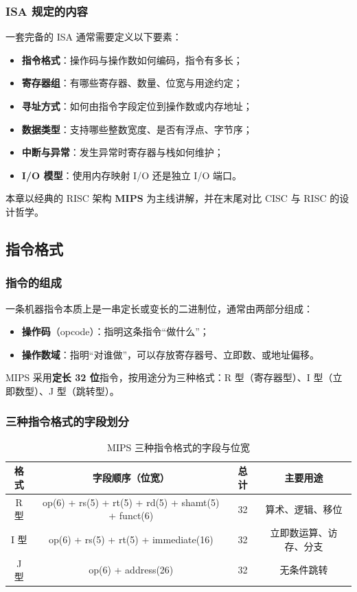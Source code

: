 \subsubsection{ISA 规定的内容}

一套完备的 ISA 通常需要定义以下要素：

\begin{itemize}
    \item \textbf{指令格式}：操作码与操作数如何编码，指令有多长；
    \item \textbf{寄存器组}：有哪些寄存器、数量、位宽与用途约定；
    \item \textbf{寻址方式}：如何由指令字段定位到操作数或内存地址；
    \item \textbf{数据类型}：支持哪些整数宽度、是否有浮点、字节序；
    \item \textbf{中断与异常}：发生异常时寄存器与栈如何维护；
    \item \textbf{I/O 模型}：使用内存映射 I/O 还是独立 I/O 端口。
\end{itemize}

本章以经典的 RISC 架构 \textbf{MIPS} 为主线讲解，并在末尾对比 CISC 与 RISC 的设计哲学。

\subsection{指令格式}

\subsubsection{指令的组成}

一条机器指令本质上是一串定长或变长的二进制位，通常由两部分组成：

\begin{itemize}
    \item \textbf{操作码}（opcode）：指明这条指令“做什么”；
    \item \textbf{操作数域}：指明“对谁做”，可以存放寄存器号、立即数、或地址偏移。
\end{itemize}

MIPS 采用\textbf{定长 32 位}指令，按用途分为三种格式：R 型（寄存器型）、I 型（立即数型）、J 型（跳转型）。

\subsubsection{三种指令格式的字段划分}

\begin{table}[H]
\centering
\caption{MIPS 三种指令格式的字段与位宽}
\label{tab:mips_fields}
\begin{tabulary}{\textwidth}{CCCC}
\toprule
\textbf{格式} & \textbf{字段顺序（位宽）} & \textbf{总计} & \textbf{主要用途} \\
\midrule
R 型 & op(6) + rs(5) + rt(5) + rd(5) + shamt(5) + funct(6) & 32 & 算术、逻辑、移位 \\
I 型 & op(6) + rs(5) + rt(5) + immediate(16) & 32 & 立即数运算、访存、分支 \\
J 型 & op(6) + address(26) & 32 & 无条件跳转 \\
\bottomrule
\end{tabulary}
\end{table}


